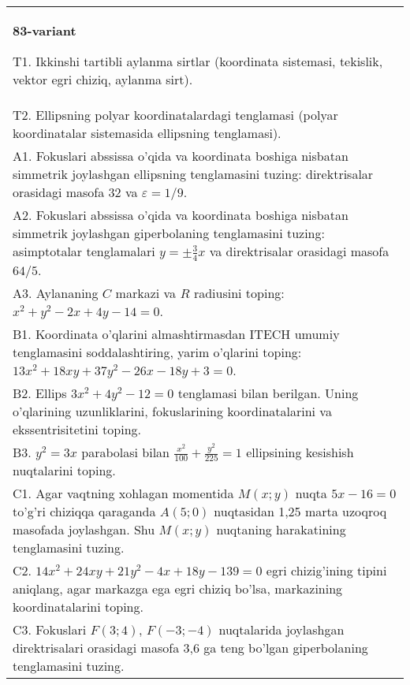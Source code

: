 \documentclass{article}
\begin{document}
\begin{tabular}{m{17cm}}
\textbf{83-variant}
\newline

T1. Ikkinshi tartibli aylanma sirtlar (koordinata sistemasi, tekislik, vektor egri chiziq, aylanma sirt).\\

T2. Ellipsning polyar koordinatalardagi tenglamasi (polyar koordinatalar sistemasida ellipsning tenglamasi).\\

A1. Fokuslari abssissa o'qida va koordinata boshiga nisbatan simmetrik joylashgan ellipsning tenglamasini tuzing: direktrisalar orasidagi masofa $32$ va $\varepsilon=1/9$.\\

A2. Fokuslari abssissa o'qida va koordinata boshiga nisbatan simmetrik joylashgan giperbolaning tenglamasini tuzing: asimptotalar tenglamalari $y=\pm \frac{3}{4}x$ va direktrisalar orasidagi masofa $64/5$.\\

A3. Aylananing $C$ markazi va $R$ radiusini toping: $x^2+y^2-2x+4y-14=0$.\\

B1. Koordinata o'qlarini almashtirmasdan ITECH umumiy tenglamasini soddalashtiring, yarim o'qlarini toping: $13x^{2} + 18xy + 37y^{2} - 26x - 18y + 3 = 0$.  \\

B2. Ellips $3x^{2} + 4y^{2} - 12 = 0$ tenglamasi bilan berilgan. Uning o'qlarining uzunliklarini, fokuslarining koordinatalarini va ekssentrisitetini toping.  \\

B3. $y^{2} = 3x$ parabolasi bilan $\frac{x^{2}}{100} + \frac{y^{2}}{225} = 1$ ellipsining kesishish nuqtalarini toping.  \\

C1. Agar vaqtning xohlagan momentida $M(x;y)$ nuqta $5x - 16 = 0$ to'g'ri chiziqqa qaraganda $A(5;0)$ nuqtasidan 1,25 marta uzoqroq masofada joylashgan. Shu $M(x;y)$ nuqtaning harakatining tenglamasini tuzing.  \\

C2. $14x^{2} + 24xy + 21y^{2} - 4x + 18y - 139 = 0$ egri chizig'ining tipini aniqlang, agar markazga ega egri chiziq bo'lsa, markazining koordinatalarini toping.  \\

C3. Fokuslari $F(3;4)$, $F(-3;-4)$ nuqtalarida joylashgan direktrisalari orasidagi masofa 3,6 ga teng bo'lgan giperbolaning tenglamasini tuzing.  \\

\end{tabular}
\vspace{1cm}
\end{document}
